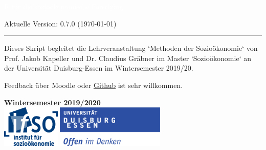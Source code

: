 \onehalfspacing
{}

\begin{titlepage}
\BgThispage
{}
\vspace*{2cm}
\noindent
\textcolor{white}{\bigsf R für die \mbox{sozioökonomische} Forschung}
\vspace*{1.0cm}\par
Aktuelle Version: 0.7.0 (\today)\\
\vspace*{2.0cm}\par
\noindent
\begin{minipage}{0.35\linewidth}
    \begin{flushright}
        \printauthor
    \end{flushright}
\end{minipage} \hspace{15pt}
%
\begin{minipage}{0.02\linewidth}
    \rule{1pt}{175pt}
\end{minipage} \hspace{-10pt}
%
\begin{minipage}{0.6\linewidth}
\vspace{5pt}
\begin{adjustwidth}{25pt}{25pt}
\raggedright
Dieses Skript begleitet die Lehrveranstaltung `Methoden der Sozioökonomie` von
Prof. Jakob Kapeller und Dr. Claudius Gräbner im Master `Sozioökonomie` an der
Universität Duisburg-Essen im Wintersemester 2019/20.

Feedback über Moodle oder
\href{https://github.com/graebnerc/RforSocioEcon}{Github} ist
sehr willkommen.
\end{adjustwidth}

\end{minipage}

\vspace{0.25cm}
\centering
\vspace{1.25cm}
\textbf{Wintersemester 2019/2020}\\
\vfill
\includegraphics[height=2cm]{figures/ifso_logo_dt_RGB} \hspace{2cm}
\includegraphics[height=2cm]{figures/logo_ude.pdf}
\end{titlepage}

\newpage
{}
